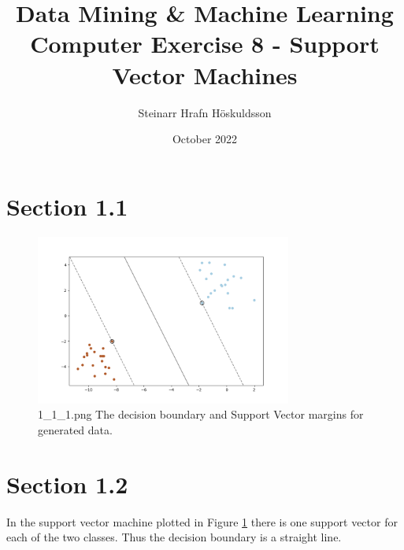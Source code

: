 \documentclass{article}
\title{Data Mining \& Machine Learning \\ \large Computer Exercise 8 - Support Vector Machines}
\author{Steinarr Hrafn Höskuldsson}
\date{October 2022}
\newcommand{\mycomment}[1]{}
\begin{document}
\maketitle
\mycomment{
\begin{figure}[h]
    \centering
    \texttt{[image: LAB3/Basic1.png]}
    \caption{"Switch test" Breadboard set up}
    \label{fig:Switch_test}
\end{figure}



}
\section*{Section 1.1}
\begin{figure}[H]
    \centering
    \includegraphics[width=0.75\textwidth]{08_SVM/1_1_1.png}
    \caption{1\_1\_1.png The decision boundary and Support Vector margins for generated data.}
    \label{fig:section11}
\end{figure}

\section*{Section 1.2}
In the support vector machine plotted in Figure \ref{fig:section11} there is one support vector for each of the two classes. Thus the decision boundary is a straight line.
\end{document}
